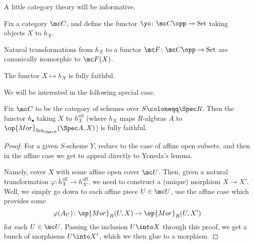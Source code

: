 \documentclass[../notes.tex]{subfiles}
\begin{document}
A little category theory will be informative.
\begin{thm}
	Fix a category $\mc C$, and define the functor $\yo\colon\mc C\opp\to\mathrm{Set}$ taking objects $X$ to $h_X$.
	\begin{listalph}
		\item Natural transformations from $h_X$ to a functor $\mc F\colon\mc C\opp\to\mathrm{Set}$ are canonically isomorphic to $\mc F(X)$.
		\item The functor $X\mapsto h_X$ is fully faithful.
	\end{listalph}
\end{thm}
We will be interested in the following special case.
\begin{corollary}
	Fix $\mc C$ to be the category of schemes over $S\coloneqq\Spec R$. Then the functor $h_\bullet$ taking $X$ to $h_X^{\mathrm{aff}}$ (where $h_X$ maps $R$-algbras $A$ to $\op{Mor}_{\mathrm{Sch}_{\Spec R}}(\Spec A,X)$) is fully faithful.
\end{corollary}
\begin{proof}
	For a given $S$-scheme $Y$, reduce to the case of affine open subsets, and then in the affine case we get to appeal directly to Yoneda's lemma.

	Namely, cover $X$ with some affine open cover $\mc U$. Then, given a natural transformation $\varphi\colon h_X^{\mathrm{aff}}\to h_{X'}^{\mathrm{aff}}$, we need to construct a (unique) morphism $X\to X'$. Well, we simply go down to each affine piece $U\in\mc U$, use the affine case which provides some
	\[\varphi(A_U)\colon\op{Mor}_R(U,X)\to\op{Mor}_R(U,X')\]
	for each $U\in\mc U$. Passing the inclusion $U\into X$ through this proof, we get a bunch of morphisms $U\into X'$, which we then glue to a morphism.
\end{proof}
\end{document}
